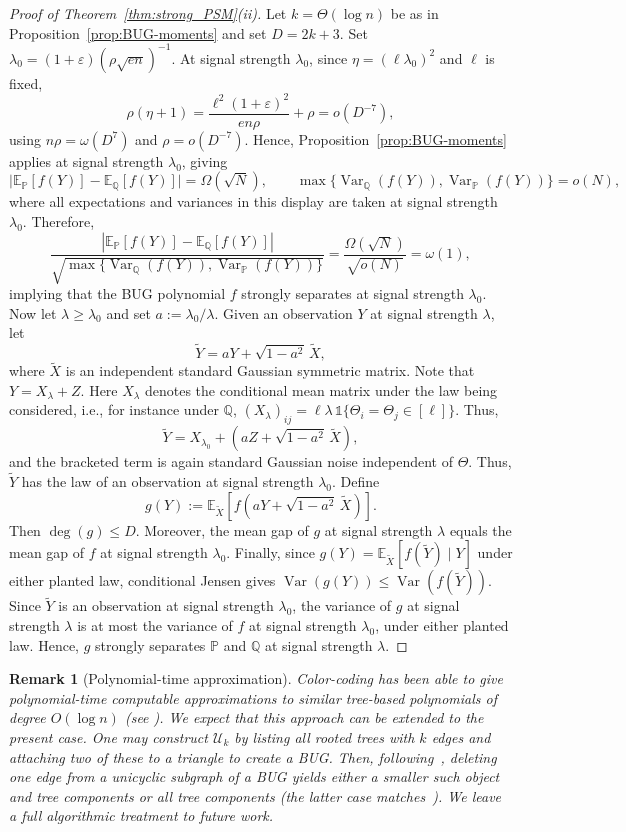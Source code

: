 \documentclass[11pt, letterpaper]{article}
\newtheorem{remark}[theorem]{Remark}
\numberwithin{equation}{section}
\newcommand{\E}{\mathbb{E}}
\newcommand{\PP}{\mathbb{P}}
\newcommand{\QQ}{\mathbb{Q}}
\begin{document}
\begin{proof}[Proof of Theorem~\ref{thm:strong_PSM}\textnormal{(ii)}] Let $k=\Theta(\log n)$ be as in Proposition~\ref{prop:BUG-moments} and set
$D=2k+3$. Set $\lambda_0=(1+\varepsilon)(\rho\sqrt{en})^{-1}$. At signal strength $\lambda_0$, since $\eta=(\ell\lambda_0)^2$ and $\ell$ is fixed,
\[\rho(\eta+1)=\frac{\ell^2(1+\varepsilon)^2}{en\rho}+\rho=
o(D^{-7}),
\]
using $n\rho=\omega(D^7)$ and $\rho=o(D^{-7})$. Hence, Proposition~\ref{prop:BUG-moments} applies at signal strength $\lambda_0$, giving
\[
\bigl|\E_\PP[f(Y)]-\E_\QQ[f(Y)]\bigr|=\Omega(\sqrt N),
\qquad
\max\{\operatorname{Var}_\QQ(f(Y)),\operatorname{Var}_\PP(f(Y))\}=o(N),
\]
where all expectations and variances in this display are taken at signal strength $\lambda_0$. Therefore,
\[
\frac{\left|\E_\PP[f(Y)]-\E_\QQ[f(Y)]\right|}
{\sqrt{\max\{\operatorname{Var}_\QQ(f(Y)),\operatorname{Var}_\PP(f(Y))\}}}
=
\frac{\Omega(\sqrt N)}{\sqrt{o(N)}}=\omega(1),
\]
implying that the BUG polynomial $f$ strongly separates at signal strength $\lambda_0$. Now let $\lambda\ge\lambda_0$ and set $a:=\lambda_0/\lambda$. Given an observation
$Y$ at signal strength $\lambda$, let
\[
\widetilde Y=aY+\sqrt{1-a^2}\,\widetilde X,
\]
where $\widetilde X$ is an independent standard Gaussian symmetric matrix. Note that
$Y=X_\lambda+Z$. Here $X_\lambda$ denotes the conditional mean matrix under the law being considered, i.e., for instance under $\QQ$, $(X_\lambda)_{ij}=\ell\lambda\,\mathds 1\{\Theta_i=\Theta_j\in[\ell]\}.$ Thus,
\[
\widetilde Y
=
X_{\lambda_0}
+
\left(aZ+\sqrt{1-a^2}\,\widetilde X\right),
\]
and the bracketed term is again standard Gaussian noise independent of $\Theta$.
Thus, $\widetilde Y$ has the law of an observation at signal strength $\lambda_0$. Define
\[
g(Y):=\E_{\widetilde X}\left[f\left(aY+\sqrt{1-a^2}\,\widetilde X\right)\right].
\]
Then $\deg(g)\le D$. Moreover, the mean gap of $g$ at signal strength $\lambda$
equals the mean gap of $f$ at signal strength $\lambda_0$. Finally, since
$g(Y)=\E_{\widetilde X}[f(\widetilde Y)\mid Y]$ under
either planted law, conditional Jensen gives $\operatorname{Var}(g(Y))
\le
\operatorname{Var}(f(\widetilde Y)).$ Since $\widetilde Y$ is an observation at signal strength $\lambda_0$,
the variance of $g$ at signal strength $\lambda$ is at most the variance of $f$
at signal strength $\lambda_0$, under either planted law. Hence, $g$ strongly
separates $\PP$ and $\QQ$ at signal strength $\lambda$.
\end{proof}
\begin{remark}[Polynomial-time approximation] Color-coding \cite{alon1995color} has been able to give polynomial-time computable approximations to similar tree-based polynomials of degree $O(\log n)$ (see \cite{mao2024testing}). We expect that this approach can be extended to the present case. One may construct $\mathcal{U}_k$ by listing all rooted trees with $k$ edges and attaching two of these to a triangle to create a BUG.
Then, following~\cite{mao2024testing}, deleting one edge from a unicyclic subgraph of a BUG yields either a smaller such object and tree components or all tree components (the latter case matches~\cite{mao2024testing}). We leave a full algorithmic treatment to future work.
\end{remark}
\end{document}
